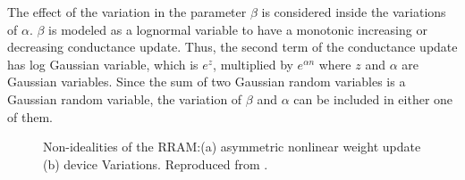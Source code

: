 \documentclass[english]{article}
\renewcommand{\cite}{\citep}
\begin{document}
The effect of the variation in the parameter $\beta$ is considered inside the variations of $\alpha$. $\beta$ is modeled as a lognormal variable to have a monotonic increasing or decreasing conductance update.
Thus, the second term of the conductance update has log Gaussian variable, which is $e^z$, multiplied by $e^{\alpha n}$ where $z$ and $\alpha$ are Gaussian variables.
Since the sum of two Gaussian random variables is a Gaussian random variable, the variation of $\beta$ and $\alpha$ can be included in either one of them. 
%
\begin{figure}[!t]
\centering
\vspace{-0.15in}
\hfil
{}
\vspace{-0.05in}
\caption{Non-idealities of the RRAM:(a) asymmetric nonlinear weight update (b) device Variations. Reproduced from \cite{fouda2018independent}.}
\label{ConductanceVsPulsesFigure}
\vspace{-0.05in}
\end{figure}
%
\end{document}

